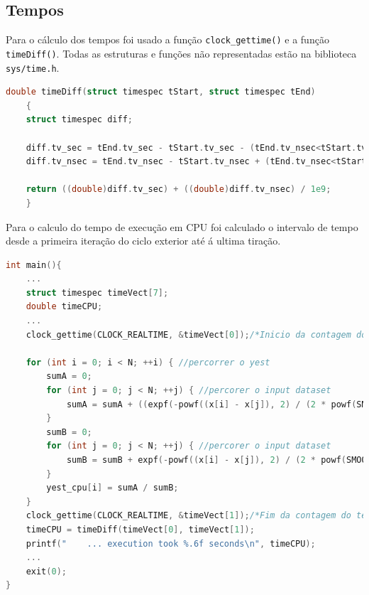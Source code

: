 \documentclass[11pt]{article}
\numberwithin{equation}{section}
\begin{document}
\subsection{Tempos}
Para o cálculo dos tempos foi usado a função \texttt{clock\_gettime()} e a função \texttt{timeDiff()}. Todas as estruturas e funções não representadas estão na biblioteca \texttt{sys/time.h}.
\begin{lstlisting}[language=C]
	double timeDiff(struct timespec tStart, struct timespec tEnd)
	{
	struct timespec diff;
	
	diff.tv_sec = tEnd.tv_sec - tStart.tv_sec - (tEnd.tv_nsec<tStart.tv_nsec ? 1 : 0);
	diff.tv_nsec = tEnd.tv_nsec - tStart.tv_nsec + (tEnd.tv_nsec<tStart.tv_nsec ? 1000000000 : 0);
	
	return ((double)diff.tv_sec) + ((double)diff.tv_nsec) / 1e9;
	}
\end{lstlisting}
Para o calculo do tempo de execução em CPU foi calculado o intervalo de tempo desde a primeira iteração do ciclo exterior até á ultima tiração.
\begin{lstlisting}[language=C]
int main(){
	...
	struct timespec timeVect[7];
	double timeCPU;
	...
	clock_gettime(CLOCK_REALTIME, &timeVect[0]);/*Inicio da contagem do tempo*/
	
	for (int i = 0; i < N; ++i) { //percorrer o yest
		sumA = 0;
		for (int j = 0; j < N; ++j) { //percorer o input dataset
			sumA = sumA + ((expf(-powf((x[i] - x[j]), 2) / (2 * powf(SMOOTH, 2)))) * y[j]);
		}
		sumB = 0;
		for (int j = 0; j < N; ++j)	{ //percorer o input dataset
			sumB = sumB + expf(-powf((x[i] - x[j]), 2) / (2 * powf(SMOOTH, 2)));
		}
		yest_cpu[i] = sumA / sumB;
	}
	clock_gettime(CLOCK_REALTIME, &timeVect[1]);/*Fim da contagem do tempo*/
	timeCPU = timeDiff(timeVect[0], timeVect[1]);
	printf("    ... execution took %.6f seconds\n", timeCPU);
	...
	exit(0);
}
\end{lstlisting}
\end{document}
